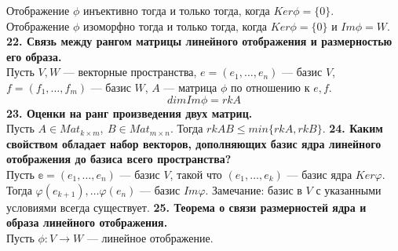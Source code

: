 \documentclass{article}
\begin{document}
Отображение $\phi$ инъективно тогда и только тогда, когда $Ker \phi = \{0\}$.\\
Отображение $\phi$ изоморфно тогда и только тогда, когда $Ker \phi = \{0\}$ и $Im\phi = W$.
\newline
\newline
\textbf{22. Связь между рангом матрицы линейного отображения и размерностью его образа.}\\
Пусть $V, W$ --- векторные пространства, $e = (e_1, \ldots, e_n)$ --- базис $V$, $f= (f_1, \ldots, f_m)$ --- базис $W$, $A$ --- матрица $\phi$ по отношению к $e, f$.
$$dimIm\phi = rkA$$
\newline
\newline
\textbf{23. Оценки на ранг произведения двух матриц.}\\
Пусть $A \in Mat_{k\times m},\ B\in Mat_{m\times n}$. Тогда $rk AB \leqslant min\{rk A, rk B\}$.
\newline
\newline
\textbf{24. Каким свойством обладает набор векторов, дополняющих базис ядра линейного отображения до базиса всего пространства?}\\
Пусть  $\mathbb{e} = (e_1, \ldots, e_n)$ --- базис $V$, такой что $(e_1, \ldots, e_k)$ --- базис ядра $Ker\varphi$. Тогда $\varphi(e_{k+1}),\ldots\varphi(e_n)$ --- базис $Im\varphi$. 
Замечание: базис в $V$ с указанными условиями всегда существует.
\newline
\newline
\textbf{25. Теорема о связи размерностей ядра и образа линейного отображения.}\\
Пусть $\phi\colon V \rightarrow W$ --- линейное отображение.
\end{document}
